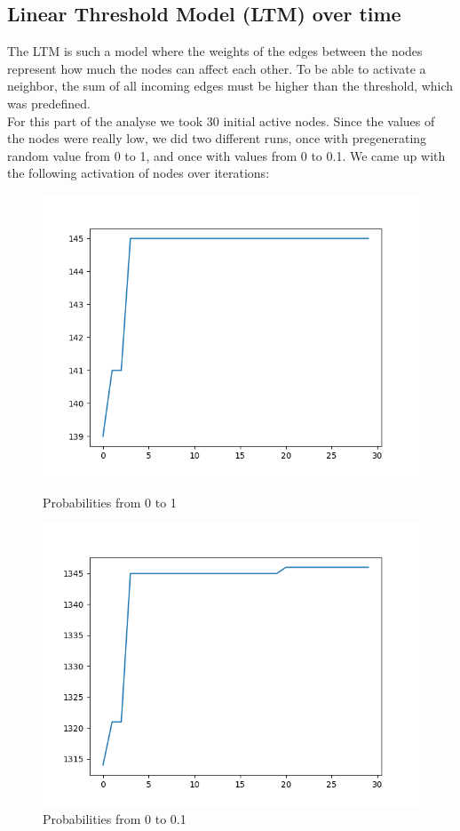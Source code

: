 \subsection{Linear Threshold Model (LTM) over time}
The LTM is such a model where the weights of the edges between the nodes represent how much the nodes can affect each other. To be able to activate a neighbor, the sum of all incoming edges must be higher than the threshold, which was predefined. \\
For this part of the analyse we took 30 initial active nodes. Since the values of the nodes were really low, we did two different runs, once with pregenerating random value from 0 to 1, and once with values from 0 to 0.1. We came up with the following activation of nodes over iterations:
\begin{figure}[H]
    \includegraphics[width=\linewidth]{Report/figs/sumLTM-0to1.png}
    \caption{Probabilities from 0 to 1}\label{fig:sumLTM01}
\endminipage\hfill
{}
    \includegraphics[width=\linewidth]{Report/figs/sumLTM.png}
    \caption{Probabilities from 0 to 0.1}\label{fig:sumltm}
\endminipage
\end{figure}
\newpage
